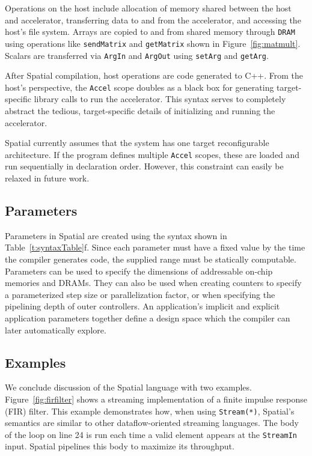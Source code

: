 Operations on the host include allocation of memory shared between the host and accelerator, transferring data to and from the accelerator, and accessing the host's file system.
Arrays are copied to and from shared memory through \texttt{\small{DRAM}} using operations like \texttt{\small{sendMatrix}} and \texttt{\small{getMatrix}} shown in Figure~\ref{fig:matmult}. Scalars are transferred via \texttt{\small{ArgIn}} and \texttt{\small{ArgOut}} using \texttt{\small{setArg}} and \texttt{\small{getArg}}.

After Spatial compilation, host operations are code generated to C++.
From the host's perspective, the \texttt{\small{Accel}} scope doubles as a black box for generating target-specific library calls to run the accelerator.
This syntax serves to completely abstract the tedious, target-specific details of initializing and running the accelerator.

Spatial currently assumes that the system has one target reconfigurable architecture.
If the program defines multiple \texttt{\small{Accel}} scopes, these are loaded and run sequentially in declaration order. However, this constraint can easily be relaxed in future work.



\subsection{Parameters}
Parameters in Spatial are created using the syntax shown in Table~\ref{t:syntaxTable}f.
Since each parameter must have a fixed value by the time the compiler generates code, the supplied range must be statically computable.
Parameters can be used to specify the dimensions of addressable on-chip memories and DRAMs.
They can also be used when creating counters to specify a parameterized step size or parallelization factor, or when specifying the pipelining depth of outer controllers.
An application's implicit and explicit application parameters together define a design space which the compiler can later automatically explore.

\subsection{Examples}




We conclude discussion of the Spatial language with two examples.
Figure~\ref{fig:firfilter} shows a streaming implementation of a finite impulse response (FIR) filter.
This example demonstrates how, when using \texttt{\small{Stream(*)}}, Spatial's semantics are similar to other dataflow-oriented streaming languages. The body of the loop on line 24 is run each time a valid element appears at the \texttt{\small{StreamIn}} input. Spatial pipelines this body to maximize its throughput.


